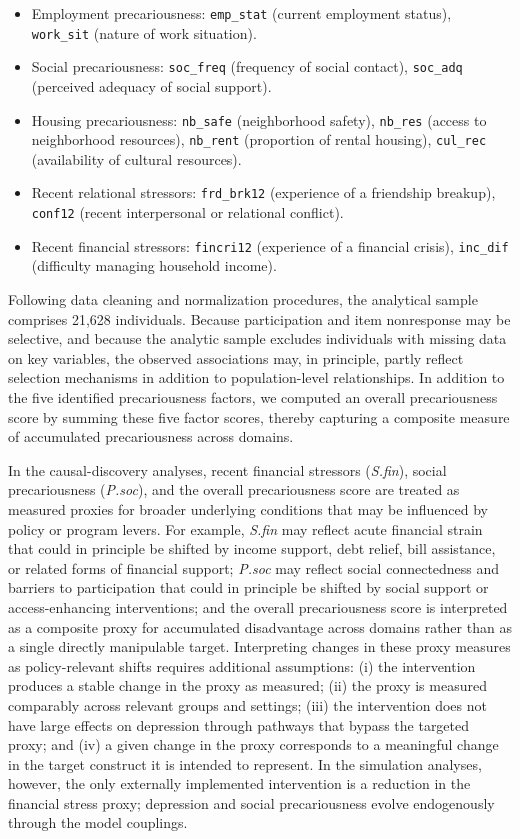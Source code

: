 \documentclass[
]{article}
\providecommand{\tightlist}{%
  \setlength{\itemsep}{0pt}\setlength{\parskip}{0pt}}\usepackage{longtable,booktabs,array}
\begin{document}
\begin{itemize}
\tightlist
\item
  Employment precariousness: \texttt{emp\_stat} (current employment
  status), \texttt{work\_sit} (nature of work situation).
\item
  Social precariousness: \texttt{soc\_freq} (frequency of social
  contact), \texttt{soc\_adq} (perceived adequacy of social support).
\item
  Housing precariousness: \texttt{nb\_safe} (neighborhood safety),
  \texttt{nb\_res} (access to neighborhood resources), \texttt{nb\_rent}
  (proportion of rental housing), \texttt{cul\_rec} (availability of
  cultural resources).
\item
  Recent relational stressors: \texttt{frd\_brk12} (experience of a
  friendship breakup), \texttt{conf12} (recent interpersonal or
  relational conflict).
\item
  Recent financial stressors: \texttt{fincri12} (experience of a
  financial crisis), \texttt{inc\_dif} (difficulty managing household
  income).
\end{itemize}

Following data cleaning and normalization procedures, the analytical
sample comprises 21,628 individuals. Because participation and item
nonresponse may be selective, and because the analytic sample excludes
individuals with missing data on key variables, the observed
associations may, in principle, partly reflect selection mechanisms in
addition to population-level relationships. In addition to the five
identified precariousness factors, we computed an overall precariousness
score by summing these five factor scores, thereby capturing a composite
measure of accumulated precariousness across domains.

In the causal-discovery analyses, recent financial stressors
(\textit{S.fin}), social precariousness (\textit{P.soc}), and the
overall precariousness score are treated as measured proxies for broader
underlying conditions that may be influenced by policy or program
levers. For example, \textit{S.fin} may reflect acute financial strain
that could in principle be shifted by income support, debt relief, bill
assistance, or related forms of financial support; \textit{P.soc} may
reflect social connectedness and barriers to participation that could in
principle be shifted by social support or access-enhancing
interventions; and the overall precariousness score is interpreted as a
composite proxy for accumulated disadvantage across domains rather than
as a single directly manipulable target. Interpreting changes in these
proxy measures as policy-relevant shifts requires additional
assumptions: (i) the intervention produces a stable change in the proxy
as measured; (ii) the proxy is measured comparably across relevant
groups and settings; (iii) the intervention does not have large effects
on depression through pathways that bypass the targeted proxy; and (iv)
a given change in the proxy corresponds to a meaningful change in the
target construct it is intended to represent. In the simulation
analyses, however, the only externally implemented intervention is a
reduction in the financial stress proxy; depression and social
precariousness evolve endogenously through the model couplings.
\end{document}
